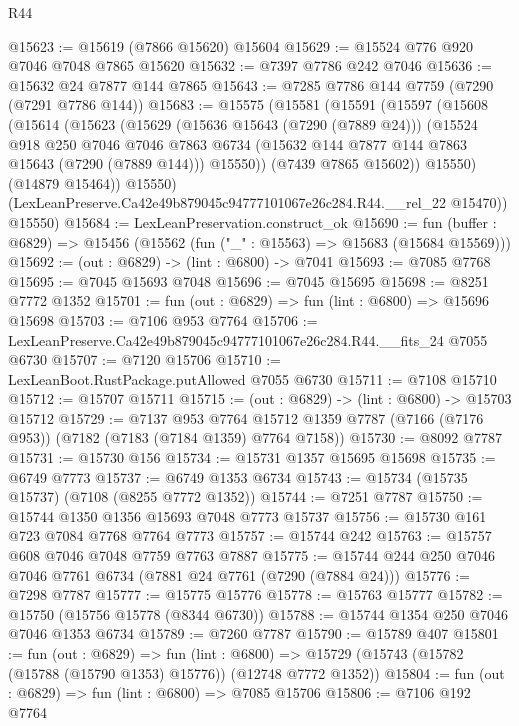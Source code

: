 \begin{lexlean}{R44}
\begin{coremodule}
{@15623 := @15619 (@7866 @15620) @15604
@15629 := @15524 @776 @920 @7046 @7048 @7865 @15620
@15632 := @7397 @7786 @242 @7046
@15636 := @15632 @24 @7877 @144 @7865
@15643 := @7285 @7786 @144 @7759 (@7290 (@7291 @7786 @144))
@15683 := @15575
    (@15581
      (@15591
        (@15597
          (@15608
            (@15614
              (@15623
                (@15629
                  (@15636 @15643 (@7290 (@7889 @24)))
                  (@15524
                    @918
                    @250
                    @7046
                    @7046
                    @7863
                    @6734
                    (@15632 @144 @7877 @144 @7863 @15643 (@7290 (@7889 @144)))
                    @15550))
                (@7439 @7865 @15602))
              @15550)
            (@14879 @15464))
          @15550)
        (LexLeanPreserve.Ca42e49b879045c94777101067e26c284.R44.__rel_22 @15470))
      @15550)
@15684 := LexLeanPreservation.construct_ok
@15690 := fun (buffer : @6829) => @15456 (@15562 (fun ("_" : @15563) => @15683 (@15684 @15569)))
@15692 := (out : @6829) -> (lint : @6800) -> @7041
@15693 := @7085 @7768
@15695 := @7045 @15693 @7048
@15696 := @7045 @15695
@15698 := @8251 @7772 @1352
@15701 := fun (out : @6829) => fun (lint : @6800) => @15696 @15698
@15703 := @7106 @953 @7764
@15706 := LexLeanPreserve.Ca42e49b879045c94777101067e26c284.R44.__fits_24 @7055 @6730
@15707 := @7120 @15706
@15710 := LexLeanBoot.RustPackage.putAllowed @7055 @6730
@15711 := @7108 @15710
@15712 := @15707 @15711
@15715 := (out : @6829) -> (lint : @6800) -> @15703 @15712
@15729 := @7137
    @953
    @7764
    @15712
    @1359
    @7787
    (@7166 (@7176 @953))
    (@7182 (@7183 (@7184 @1359) @7764 @7158))
@15730 := @8092 @7787
@15731 := @15730 @156
@15734 := @15731 @1357 @15695 @15698
@15735 := @6749 @7773
@15737 := @6749 @1353 @6734
@15743 := @15734 (@15735 @15737) (@7108 (@8255 @7772 @1352))
@15744 := @7251 @7787
@15750 := @15744 @1350 @1356 @15693 @7048 @7773 @15737
@15756 := @15730 @161 @723 @7084 @7768 @7764 @7773
@15757 := @15744 @242
@15763 := @15757 @608 @7046 @7048 @7759 @7763 @7887
@15775 := @15744 @244 @250 @7046 @7046 @7761 @6734 (@7881 @24 @7761 (@7290 (@7884 @24)))
@15776 := @7298 @7787
@15777 := @15775 @15776
@15778 := @15763 @15777
@15782 := @15750 (@15756 @15778 (@8344 @6730))
@15788 := @15744 @1354 @250 @7046 @7046 @1353 @6734
@15789 := @7260 @7787
@15790 := @15789 @407
@15801 := fun (out : @6829) =>
  fun (lint : @6800) => @15729 (@15743 (@15782 (@15788 (@15790 @1353) @15776)) (@12748 @7772 @1352))
@15804 := fun (out : @6829) => fun (lint : @6800) => @7085 @15706
@15806 := @7106 @192 @7764
}
\end{coremodule}
\end{lexlean}
